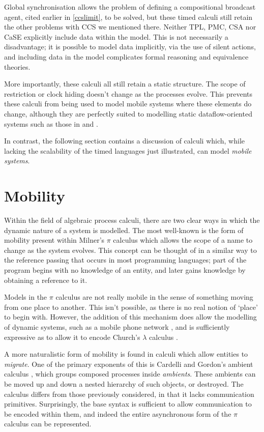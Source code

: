 Global synchronisation allows the problem of defining a compositional
broadcast agent, cited earlier in \ref{ccslimit}, to be solved, but
these timed calculi still retain the other problems with CCS we
mentioned there.  Neither TPL, PMC, CSA nor CaSE explicitly include
data within the model.  This is not necessarily a disadvantage; it is
possible to model data implicitly, via the use of silent actions, and
including data in the model complicates formal reasoning and
equivalence theories.

More importantly, these calculi all still retain a static structure.
The scope of restriction or clock hiding doesn't change as the
processes evolve.  This prevents these calculi from being used to
model mobile systems where these elements do change, although they
are perfectly suited to modelling static dataflow-oriented systems
such as those in \cite{WICSA} and \cite{cashews-sem}.

In contrast, the following section contains a discussion of calculi
which, while lacking the scalability of the timed languages just
illustrated, can model \emph{mobile systems}.

\section{Mobility}
\label{mobility}

Within the field of algebraic process calculi, there are two clear ways
in which the dynamic nature of a system is modelled.  The most
well-known is the form of mobility present within Milner's $\pi$
calculus which allows the scope of a name to change as the system
evolves.  This concept can be thought of in a similar way to the
reference passing that occurs in most programming languages; part of the
program begins with no knowledge of an entity, and later gains knowledge
by obtaining a reference to it.

Models in the $\pi$ calculus are not really mobile in the sense of
something moving from one place to another.  This isn't possible, as
there is no real notion of `place' to begin with.  However, the addition
of this mechanism does allow the modelling of dynamic systems, such as a
mobile phone network \cite{milner:lecture}, and is sufficiently
expressive as to allow it to encode Church's $\lambda$ calculus
\cite{funcproc}.

A more naturalistic form of mobility is found in calculi which allow
entities to \emph{migrate}.  One of the primary exponents of this is
Cardelli and Gordon's ambient calculus \cite{amb}, which groups
composed processes inside \emph{ambients}.  These ambients can be
moved up and down a nested hierarchy of such objects, or destroyed.  The
calculus differs from those previously considered, in that it
lacks communication primitives.  Surprisingly, the base syntax is
sufficient to allow communication to be encoded within them, and
indeed the entire asynchronous form of the $\pi$ calculus can be
represented.

